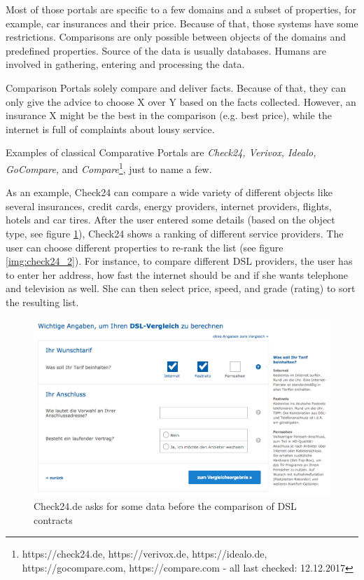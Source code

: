 Most of those portals are specific to a few domains and a subset of properties, for example, car insurances and their price. Because of that, those systems have some restrictions. Comparisons are only possible between objects of the domains and predefined properties. Source of the data is usually databases. Humans are involved in gathering, entering and processing the data.

Comparison Portals solely compare and deliver facts. Because of that, they can only give the advice to choose X over Y based on the facts collected.  However, an insurance X might be the best in the comparison (e.g. best price), while the internet is full of complaints about lousy service.\newline

Examples of classical Comparative Portals are \emph{Check24, Verivox, Idealo, GoCompare,} and \emph{Compare}\footnote{https://check24.de, https://verivox.de, https://idealo.de, https://gocompare.com, https://compare.com - all last checked: 12.12.2017}, just to name a few.

As an example, Check24 can compare a wide variety of different objects like several insurances, credit cards, energy providers, internet providers, flights, hotels and car tires. After the user entered some details (based on the object type, see figure \ref{img:check24_1}), Check24 shows a ranking of different service providers. The user can choose different properties to re-rank the list (see figure \ref{img:check24_2}).
For instance, to compare different DSL providers, the user has to enter her address, how fast the internet should be and if she wants telephone and television as well. She can then select price, speed, and grade (rating) to sort the resulting list.

\begin{figure}[h]
	\includegraphics[width=1\textwidth]{images/ds-sys/check24_1}
	\caption{Check24.de asks for some data before the comparison of DSL contracts}
		\label{img:check24_1}
\end{figure}

